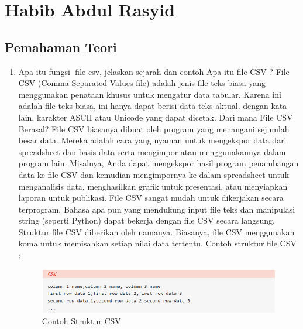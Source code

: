 \section{Habib Abdul Rasyid}
\subsection{Pemahaman Teori}
\begin {enumerate}
\item Apa itu fungsi file csv, jelaskan sejarah dan contoh Apa itu file CSV ?\newline
File CSV (Comma Separated Values file) adalah jenis file teks biasa yang menggunakan penataan khusus untuk mengatur data 		tabular. Karena ini adalah file teks biasa, ini hanya dapat berisi data teks aktual. dengan kata lain, karakter ASCII atau Unicode 	yang dapat dicetak.\newline
Dari mana File CSV Berasal?\newline
File CSV biasanya dibuat oleh program yang menangani sejumlah besar data. Mereka adalah cara yang nyaman untuk mengekspor data dari spreadsheet dan basis data serta mengimpor atau menggunakannya dalam program lain. Misalnya, Anda dapat mengekspor hasil program penambangan data ke file CSV dan kemudian mengimpornya ke dalam spreadsheet untuk menganalisis data, menghasilkan grafik untuk presentasi, atau menyiapkan laporan untuk publikasi.
File CSV sangat mudah untuk dikerjakan secara terprogram. Bahasa apa pun yang mendukung input file teks dan manipulasi string (seperti Python) dapat bekerja dengan file CSV secara langsung.
Struktur file CSV diberikan oleh namanya. Biasanya, file CSV menggunakan koma untuk memisahkan setiap nilai data tertentu. 
Contoh struktur file CSV :

\begin{figure}[h]
\centering
\includegraphics[scale=0.5]{figures/habib/struktur_csv.png}
\caption{Contoh Struktur CSV}
\label{fig:csv}
\end{figure}


\end{enumerate}
